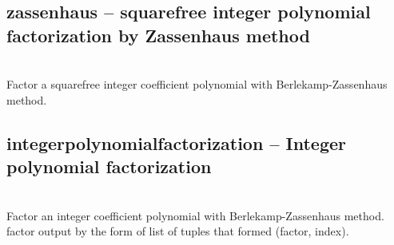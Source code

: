   \subsection{zassenhaus -- squarefree integer polynomial factorization by Zassenhaus method}
        {}
        {}\\
   \spacing
   \quad Factor a squarefree integer coefficient polynomial  with Berlekamp-Zassenhaus method.
   \spacing
%
  \subsection{integerpolynomialfactorization -- Integer polynomial factorization}
        {}
        {}\\
   \spacing
   \quad Factor an integer coefficient polynomial  with Berlekamp-Zassenhaus method.
   \spacing
   \spacing
   \quad factor output by the form of list of tuples that formed (factor, index). \\
%
\C




